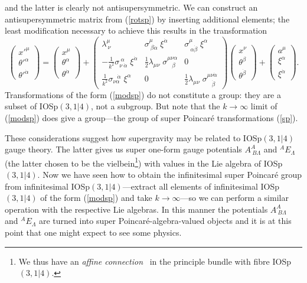 \documentclass[a4paper,12pt]{article}
\newcommand{\al}{\ensuremath{\alpha}}
\newcommand{\be}{\ensuremath{\beta}}
\newcommand{\La}{\ensuremath{\Lambda}}
\newcommand{\la}{\ensuremath{\lambda}}
\newcommand{\si}{\ensuremath{\sigma}}
\newcommand{\te}{\ensuremath{\theta}}
\begin{document}
and the latter is clearly not antisupersymmetric. We can construct an antisupersymmetric matrix from (\ref{rotsp}) by inserting additional elements; the least modification necessary to achieve this results in the transformation
\begin{equation} \label{modsp}
\left(\begin{array}{c} {x'}^\mu \\ {\te'}^\al \\ {\te'}^{\dot{\al}} \end{array}\right)
=\left(\begin{array}{c} x^\mu \\ \te^\al \\ \te^{\dot{\al}} \end{array}\right)+
\left(\begin{array}{ccc} \la^\mu_{\ \nu} & \si^\mu_{\ \be\dot{\al}}\;\xi^{\dot{\al}} & \si^\mu_{\ \al\dot{\be}}\;\xi^{\al} \\
-\frac{1}{k^2}\si_{\nu\ \dot{\al}}^{\ \al}\;\xi^{\dot{\al}} & \frac{1}{2}\la_{\mu\nu}\;\si^{\mu\nu\al}_{\ \ \ \,\be} & 0 \\
\frac{1}{k^2}\si_{\nu\al}^{\ \ \;\dot{\al}}\;\xi^\al & 0 & \frac{1}{2}\la_{\mu\nu}\;\si^{\mu\nu\dot{\al}}_{\ \ \ \,\dot{\be}} \end{array}\right)
\left(\begin{array}{c} x^\nu \\ \te^\be \\ \te^{\dot{\be}} \end{array}\right) +
\left(\begin{array}{c} a^\mu \\ \xi^\al \\ \xi^{\dot{\al}} \end{array}\right).
 \end{equation}
Transformations of the form (\ref{modsp}) do not constitute a group: they are a subset of IOSp$(3,1|4)$, not a subgroup. But note that the $k\to\infty$ limit of (\ref{modsp}) does give a group---the group of super Poincar\'{e} transformations (\ref{sp}).

These considerations suggest how supergravity may be related to IOSp$(3,1|4)$ gauge theory. The latter gives us super one-form gauge potentials $A^A_{\ B\La}$ and $^A\!E_\La$ (the latter chosen to be the vielbein\footnote{We thus have an {\it affine connection}~\cite{kob} in the principle bundle with fibre IOSp$(3,1|4)$.}) with values in the Lie algebra of IOSp$(3,1|4)$. Now we have seen how to obtain the infinitesimal super Poincar\'{e} group from infinitesimal IOSp$(3,1|4)$---extract all elements of infinitesimal  IOSp$(3,1|4)$ of the form (\ref{modsp}) and take $k\to\infty$---so we can perform a similar operation with the respective Lie algebras. In this manner the potentials $A^A_{\ B\La}$ and $^A\!E_\La$ are turned into super Poincar\'{e}-algebra-valued objects and it is at this point that one might expect to see some physics.
\end{document}
